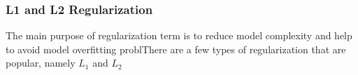 \subsubsection{L1 and L2 Regularization}

The main purpose of regularization term is to reduce model complexity and help to avoid model overfitting problThere are a few types of regularization that are popular, namely $L_1$ and $L_2$